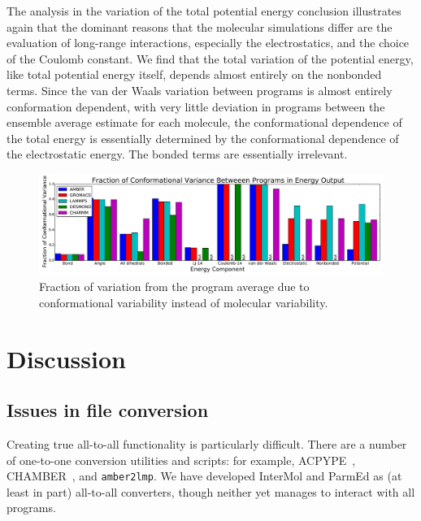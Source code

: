 The analysis in the variation of the total potential energy conclusion
illustrates again that the dominant reasons that the molecular
simulations differ are the evaluation of long-range interactions,
especially the electrostatics, and the choice of the Coulomb
constant. We find that the total variation of the potential energy,
like total potential energy itself, depends almost entirely on the
nonbonded terms.  Since the van der Waals variation between programs
is almost entirely conformation dependent, with very little deviation
in programs between the ensemble average estimate for each molecule,
the conformational dependence of the total energy is essentially
determined by the conformational dependence of the electrostatic
energy. The bonded terms are essentially irrelevant.


\begin{figure}[h]
\includegraphics[width=\textwidth]{fractionofvariation.pdf}   
\caption{Fraction of variation from the program average due to
  conformational variability instead of molecular variability.
\label{fig:confvariability}}
\end{figure}


\section*{Discussion}

\subsection*{Issues in file conversion}
Creating true all-to-all functionality is particularly
difficult. There are a number of one-to-one conversion utilities and
scripts: for example, ACPYPE~\cite{sousa_da_silva_acpype_2012},
CHAMBER~\citep{crowley_chamber:_2009}, and {\tt amber2lmp}.  We have
developed InterMol and ParmEd as (at least in part) all-to-all converters, though neither
yet manages to interact with all programs.

